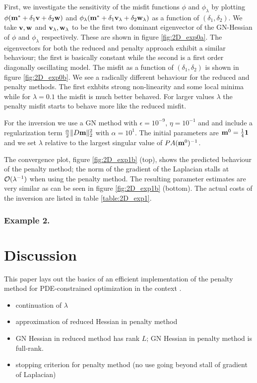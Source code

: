 \documentclass{iopart}
\begin{document}
First, we investigate the sensitivity of the misfit functions $\phi$ and $\phi_{\lambda}$ by plotting $\phi(\mathbf{m}^* + \delta_1 \mathbf{v} + \delta_2\mathbf{w})$ and
$\phi_{\lambda}(\mathbf{m}^* + \delta_1 \mathbf{v}_{\lambda} + \delta_2\mathbf{w}_{\lambda})$ as a function of $(\delta_1,\delta_2)$. 
We take $\mathbf{v}, \mathbf{w}$ and $\mathbf{v}_{\lambda}, \mathbf{w}_{\lambda}$ to be the first two dominant eigenvector of the GN-Hessian of 
$\phi$ and $\phi_{\lambda}$ respectively. These are shown in figure \ref{fig:2D_exp0a}. The eigenvectors for both the reduced and penalty
approach exhibit a similar behaviour; the first is basically constant while the second is a first order diagonally oscillating model.
The misfit as a function of $(\delta_1,\delta_2)$ is shown in figure \ref{fig:2D_exp0b}. We see a radically different behaviour for the reduced and penalty methods.
The first exhbits strong non-linearity and some local minima while for $\lambda=0.1$ the misfit is much better behaved. For larger values $\lambda$ the penalty misfit
starts to behave more like the reduced misfit.

For the inversion we use a GN method with $\epsilon=10^{-9}$, $\eta=10^{-1}$ and  and include a regularization term 
$\frac{\alpha}{2} \|D\mathbf{m}\|_2^2$ with $\alpha = 10^{1}$.
The initial parameters are $\mathbf{m}^0 = \frac{1}{4}\mathbf{1}$ and we set $\lambda$ relative to the largest singular value of $PA(\mathbf{m}^0)^{-1}$.

The convergence plot, figure \ref{fig:2D_exp1b} (top), shows the predicted behaviour 
of the penalty method; the norm of the gradient of the Laplacian stalls at $\mathcal{O}(\lambda^{-1})$ when using the penalty method. 
The resulting parameter estimates are very similar as can be seen 
in figure \ref{fig:2D_exp1b} (bottom). The actual costs of the inversion are listed in table \ref{table:2D_exp1}.

\subsubsection{Example 2.}


\section{Discussion}
\label{discussion}
This paper lays out the basics of an efficient implementation of the
penalty method for PDE-constrained optimization in the context . 
\begin{itemize}
\item continuation of $\lambda$
\item approximation of reduced Hessian in penalty method
\item GN Hessian in reduced method has rank $L$; GN Hessian in penalty method is full-rank.
\item stopping criterion for penalty method (no use going beyond stall of gradient of Laplacian)
\end{itemize}
\end{document}
